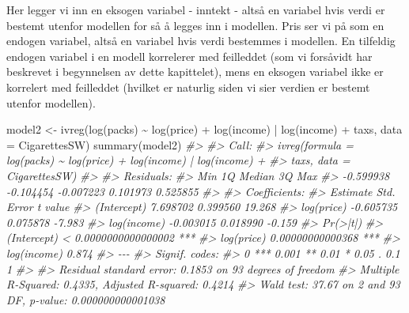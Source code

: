 \documentclass[
]{article}
\newenvironment{Shaded}{\begin{snugshade}}{\end{snugshade}}
\newcommand{\AttributeTok}[1]{\textcolor[rgb]{0.77,0.63,0.00}{#1}}
\newcommand{\CommentTok}[1]{\textcolor[rgb]{0.56,0.35,0.01}{\textit{#1}}}
\newcommand{\FunctionTok}[1]{\textcolor[rgb]{0.00,0.00,0.00}{#1}}
\newcommand{\NormalTok}[1]{#1}
\newcommand{\OtherTok}[1]{\textcolor[rgb]{0.56,0.35,0.01}{#1}}
\newcommand{\SpecialCharTok}[1]{\textcolor[rgb]{0.00,0.00,0.00}{#1}}
\begin{document}
Her legger vi inn en eksogen variabel - inntekt - altså en variabel hvis verdi er bestemt utenfor modellen for så å legges inn i modellen. Pris ser vi på som en endogen variabel, altså en variabel hvis verdi bestemmes i modellen. En tilfeldig endogen variabel i en modell korrelerer med feilleddet (som vi forsåvidt har beskrevet i begynnelsen av dette kapittelet), mens en eksogen variabel ikke er korrelert med feilleddet (hvilket er naturlig siden vi sier verdien er bestemt utenfor modellen).

\begin{Shaded}
\begin{Highlighting}[]
\NormalTok{model2 }\OtherTok{\textless{}{-}} \FunctionTok{ivreg}\NormalTok{(}\FunctionTok{log}\NormalTok{(packs) }\SpecialCharTok{\textasciitilde{}} \FunctionTok{log}\NormalTok{(price) }\SpecialCharTok{+} \FunctionTok{log}\NormalTok{(income) }\SpecialCharTok{|} \FunctionTok{log}\NormalTok{(income) }\SpecialCharTok{+}\NormalTok{ taxs, }\AttributeTok{data =}\NormalTok{ CigarettesSW)}
\FunctionTok{summary}\NormalTok{(model2)}
\CommentTok{\#\textgreater{} }
\CommentTok{\#\textgreater{} Call:}
\CommentTok{\#\textgreater{} ivreg(formula = log(packs) \textasciitilde{} log(price) + log(income) | log(income) + }
\CommentTok{\#\textgreater{}     taxs, data = CigarettesSW)}
\CommentTok{\#\textgreater{} }
\CommentTok{\#\textgreater{} Residuals:}
\CommentTok{\#\textgreater{}       Min        1Q    Median        3Q       Max }
\CommentTok{\#\textgreater{} {-}0.599938 {-}0.104454 {-}0.007223  0.101973  0.525855 }
\CommentTok{\#\textgreater{} }
\CommentTok{\#\textgreater{} Coefficients:}
\CommentTok{\#\textgreater{}              Estimate Std. Error t value}
\CommentTok{\#\textgreater{} (Intercept)  7.698702   0.399560  19.268}
\CommentTok{\#\textgreater{} log(price)  {-}0.605735   0.075878  {-}7.983}
\CommentTok{\#\textgreater{} log(income) {-}0.003015   0.018990  {-}0.159}
\CommentTok{\#\textgreater{}                         Pr(\textgreater{}|t|)    }
\CommentTok{\#\textgreater{} (Intercept) \textless{} 0.0000000000000002 ***}
\CommentTok{\#\textgreater{} log(price)      0.00000000000368 ***}
\CommentTok{\#\textgreater{} log(income)                0.874    }
\CommentTok{\#\textgreater{} {-}{-}{-}}
\CommentTok{\#\textgreater{} Signif. codes:  }
\CommentTok{\#\textgreater{} 0 \textquotesingle{}***\textquotesingle{} 0.001 \textquotesingle{}**\textquotesingle{} 0.01 \textquotesingle{}*\textquotesingle{} 0.05 \textquotesingle{}.\textquotesingle{} 0.1 \textquotesingle{} \textquotesingle{} 1}
\CommentTok{\#\textgreater{} }
\CommentTok{\#\textgreater{} Residual standard error: 0.1853 on 93 degrees of freedom}
\CommentTok{\#\textgreater{} Multiple R{-}Squared: 0.4335,  Adjusted R{-}squared: 0.4214 }
\CommentTok{\#\textgreater{} Wald test: 37.67 on 2 and 93 DF,  p{-}value: 0.000000000001038}
\end{Highlighting}
\end{Shaded}
\end{document}
